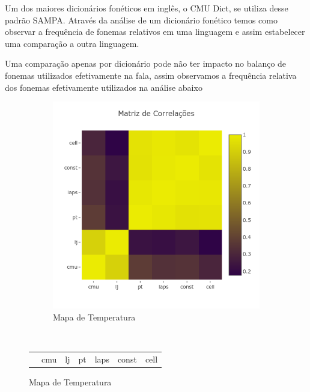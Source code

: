 Um dos maiores dicionários fonéticos em inglês, o CMU Dict\cite{cmudict}, se utiliza desse padrão SAMPA. Através da análise de um dicionário fonético temos como observar a frequência de fonemas relativos em uma linguagem e assim estabelecer uma comparação a outra linguagem. 


Uma comparação apenas por dicionário pode não ter impacto no balanço de fonemas utilizados efetivamente na fala, assim observamos a frequência relativa dos fonemas efetivamente utilizados na análise abaixo


\begin{figure}
    \centering
    \begin{subfigure}[c]{0.6\textwidth}
        \centering
        \includegraphics[width=\textwidth]{figuras/corr_phonemes.png}
        \caption{Mapa de Temperatura}
    \end{subfigure}
    ~
    \begin{subtable}{0.5\textwidth}
        \centering
        \begin{tabular}[c]{|r|cccccc|}
        \hline
        {} &        cmu &         lj &         pt &       laps &      const &       cell \\

\end{tabular}
\end{subtable}
\end{figure}
